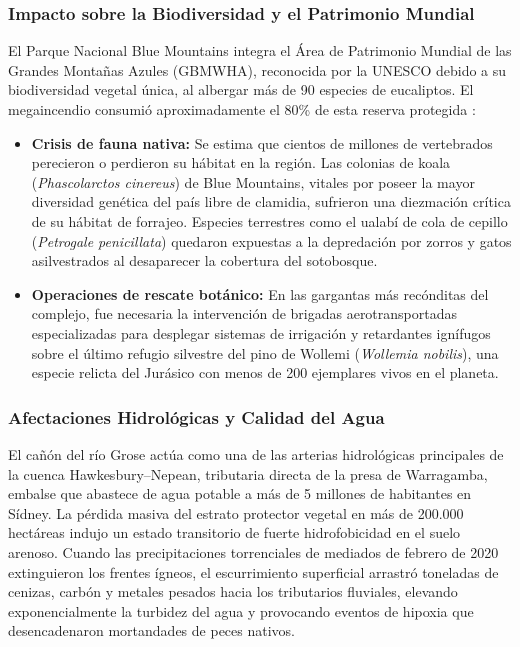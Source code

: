 \documentclass[12pt]{article}
\begin{document}
\subsubsection{Impacto sobre la Biodiversidad y el Patrimonio Mundial}
El Parque Nacional Blue Mountains integra el Área de Patrimonio Mundial de las Grandes Montañas Azules (GBMWHA), reconocida por la UNESCO debido a su biodiversidad vegetal única, al albergar más de 90 especies de eucaliptos. El megaincendio consumió aproximadamente el 80\% de esta reserva protegida \cite{hamilton2020ecological}:
\begin{itemize}
    \item \textbf{Crisis de fauna nativa:} Se estima que cientos de millones de vertebrados perecieron o perdieron su hábitat en la región. Las colonias de koala (\textit{Phascolarctos cinereus}) de Blue Mountains, vitales por poseer la mayor diversidad genética del país libre de clamidia, sufrieron una diezmación crítica de su hábitat de forrajeo. Especies terrestres como el ualabí de cola de cepillo (\textit{Petrogale penicillata}) quedaron expuestas a la depredación por zorros y gatos asilvestrados al desaparecer la cobertura del sotobosque.
    \item \textbf{Operaciones de rescate botánico:} En las gargantas más recónditas del complejo, fue necesaria la intervención de brigadas aerotransportadas especializadas para desplegar sistemas de irrigación y retardantes ignífugos sobre el último refugio silvestre del pino de Wollemi (\textit{Wollemia nobilis}), una especie relicta del Jurásico con menos de 200 ejemplares vivos en el planeta.
\end{itemize}

\subsubsection{Afectaciones Hidrológicas y Calidad del Agua}
El cañón del río Grose actúa como una de las arterias hidrológicas principales de la cuenca Hawkesbury--Nepean, tributaria directa de la presa de Warragamba, embalse que abastece de agua potable a más de 5 millones de habitantes en Sídney. La pérdida masiva del estrato protector vegetal en más de 200.000 hectáreas indujo un estado transitorio de fuerte hidrofobicidad en el suelo arenoso. Cuando las precipitaciones torrenciales de mediados de febrero de 2020 extinguieron los frentes ígneos, el escurrimiento superficial arrastró toneladas de cenizas, carbón y metales pesados hacia los tributarios fluviales, elevando exponencialmente la turbidez del agua y provocando eventos de hipoxia que desencadenaron mortandades de peces nativos.
\end{document}
